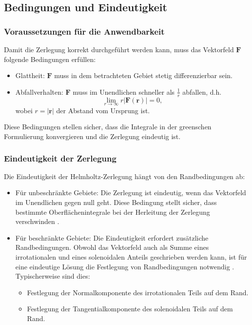 \subsection{Bedingungen und Eindeutigkeit
\label{helmholtz:subsection:Bedingungen_Eindeutigkeit}}

\subsubsection{Voraussetzungen für die Anwendbarkeit}
Damit die Zerlegung korrekt durchgeführt werden kann, muss das
Vektorfeld $\boldsymbol{F}$ folgende Bedingungen erfüllen:

\begin{itemize}
\item Glattheit: $\boldsymbol{F}$ muss in dem betrachteten Gebiet
stetig differenzierbar sein.
\item Abfallverhalten: $\boldsymbol{F}$ muss im Unendlichen schneller
als $\frac{1}{r}$ abfallen, d.h.
\begin{equation}
\lim_{r \to \infty} r|\boldsymbol{F}(\boldsymbol{r})| = 0,
\end{equation}
wobei $r = |\boldsymbol{r}|$ der Abstand vom Ursprung ist.
\end{itemize}
Diese Bedingungen stellen sicher, dass die Integrale in der greenschen
Formulierung konvergieren und die Zerlegung eindeutig ist.

\subsubsection{Eindeutigkeit der Zerlegung
\label{helmholtz:subsection:Bedingungen_onlyEindeutigkeit}}

Die Eindeutigkeit der Helmholtz-Zerlegung hängt von den Randbedingungen ab:
%

\begin{itemize}
\item Für unbeschränkte Gebiete: Die Zerlegung ist eindeutig, wenn
das Vektorfeld im Unendlichen gegen null geht.
Diese Bedingung stellt sicher, dass bestimmte Oberflächenintegrale
bei der Herleitung der Zerlegung verschwinden \cite{wiki:helmholtz}.

\item
Für beschränkte Gebiete: Die Eindeutigkeit erfordert zusätzliche
Randbedingungen.
Obwohl das Vektorfeld auch als Summe eines irrotationalen und eines
solenoidalen Anteils geschrieben werden kann, ist für eine eindeutige
Lösung die Festlegung von Randbedingungen notwendig \cite{wiki:helmholtz}.
Typischerweise sind dies:
  \begin{itemize}
    \item Festlegung der Normalkomponente des irrotationalen Teils
    auf dem Rand.
    \item Festlegung der Tangentialkomponente des solenoidalen Teils
    auf dem Rand.
  \end{itemize}
\end{itemize}

